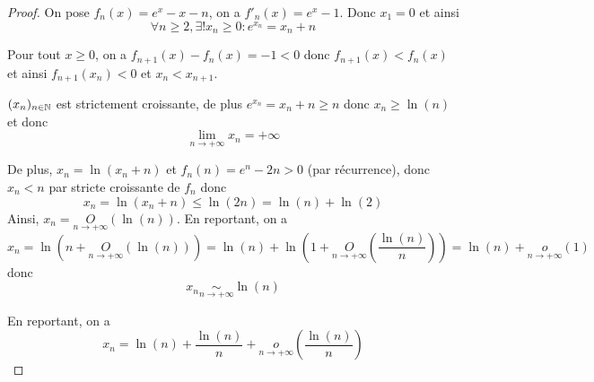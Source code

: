 \documentclass[12pt]{article}
\begin{document}
\begin{proof}
	On pose $f_{n}(x)=e^{x}-x-n$, on a $f'_{n}(x)=e^{x}-1$. Donc $x_{1}=0$ et ainsi 
	\begin{equation}\boxed{\forall n\geqslant 2,\exists! x_n\geqslant0\colon e^{x_{n}}=x_{n}+n}\end{equation}

	Pour tout $x\geqslant0$, on a $f_{n+1}(x)-f_{n}(x)=-1<0$ donc $f_{n+1}(x)<f_{n}(x)$ et ainsi $f_{n+1}(x_{n})<0$ et $x_{n}<x_{n+1}$.

	$(x_{n})_{n\in\mathbb{N}}$ est strictement croissante, de plus $e^{x_{n}}=x_{n}+n\geqslant n$ donc $x_{n}\geqslant \ln(n)$ et donc 
	\begin{equation}\boxed{\lim\limits_{n\to+\infty}x_{n}=+\infty}\end{equation}

	De plus, $x_{n}=\ln(x_{n}+n)$ et $f_{n}(n)=e^{n}-2n>0$ (par récurrence), donc $x_{n}<n$ par stricte croissante de $f_{n}$ donc 
	\begin{equation}x_{n}=\ln(x_{n}+n)\leqslant \ln(2n)=\ln(n)+\ln(2)\end{equation}
	Ainsi, $x_{n}=\underset{n\to+\infty}{O}(\ln(n))$. En reportant, on a 
	\begin{equation}x_{n}=\ln(n+\underset{n\to+\infty}{O}(\ln(n)))=\ln(n)+\ln(1+\underset{n\to+\infty}{O}\left(\frac{\ln(n)}{n}\right))=\ln(n)+\underset{n\to+\infty}{o}(1)\end{equation}
	donc 
	\begin{equation}\boxed{x_n\underset{n\to+\infty}{\sim}\ln(n)}\end{equation}

	En reportant, on a 
	\begin{equation}\boxed{x_{n}=\ln(n)+\frac{\ln(n)}{n}+\underset{n\to+\infty}{o}\left(\frac{\ln(n)}{n}\right)}\end{equation}
\end{proof}
\end{document}
